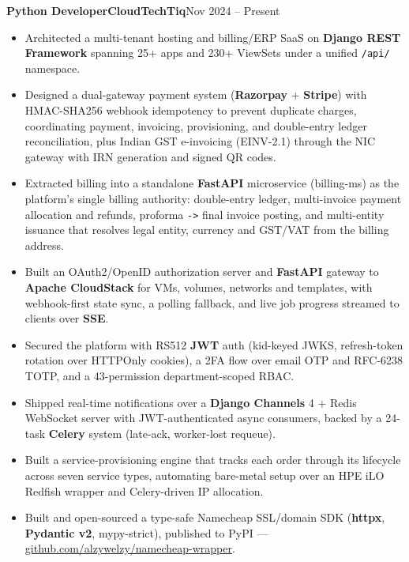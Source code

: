 \documentclass[11pt,a4paper]{article}
\newcommand{\entry}[3]{%
  \vspace{4.5pt}\noindent\textbf{#1}\hfill\textbf{#2}\hfill{\color{subtlegray}#3}\par\vspace{2pt}}
\begin{document}
\entry{Python Developer}{CloudTechTiq}{Nov 2024 -- Present}
\begin{itemize}
  \item Architected a multi-tenant hosting and billing/ERP SaaS on \textbf{Django
        REST Framework} spanning 25+ apps and 230+ ViewSets under a unified
        \texttt{/api/} namespace.
  \item Designed a dual-gateway payment system (\textbf{Razorpay} +
        \textbf{Stripe}) with HMAC-SHA256 webhook idempotency to prevent duplicate
        charges, coordinating payment, invoicing, provisioning, and double-entry
        ledger reconciliation, plus Indian GST e-invoicing (EINV-2.1) through the
        NIC gateway with IRN generation and signed QR codes.
  \item Extracted billing into a standalone \textbf{FastAPI} microservice
        (billing-ms) as the platform's single billing authority: double-entry
        ledger, multi-invoice payment allocation and refunds, proforma
        \texttt{->} final invoice posting, and multi-entity issuance that
        resolves legal entity, currency and GST/VAT from the billing address.
  \item Built an OAuth2/OpenID authorization server and \textbf{FastAPI}
        gateway to \textbf{Apache CloudStack} for VMs, volumes, networks and
        templates, with webhook-first state sync, a polling fallback, and live
        job progress streamed to clients over \textbf{SSE}.
  \item Secured the platform with RS512 \textbf{JWT} auth (kid-keyed JWKS,
        refresh-token rotation over HTTPOnly cookies), a 2FA flow over email OTP
        and RFC-6238 TOTP, and a 43-permission department-scoped RBAC.
  \item Shipped real-time notifications over a \textbf{Django Channels} 4 + Redis
        WebSocket server with JWT-authenticated async consumers, backed by a
        24-task \textbf{Celery} system (late-ack, worker-lost requeue).
  \item Built a service-provisioning engine that tracks each order through its
        lifecycle across seven service types, automating bare-metal setup over an
        HPE iLO Redfish wrapper and Celery-driven IP allocation.
  \item Built and open-sourced a type-safe Namecheap SSL/domain SDK
        (\textbf{httpx}, \textbf{Pydantic v2}, mypy-strict), published to PyPI ---
        \href{https://github.com/alzywelzy/namecheap-wrapper}{github.com/alzywelzy/namecheap-wrapper}.

\end{itemize}
\end{document}
